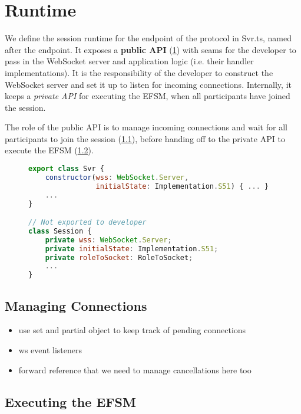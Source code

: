 \section{Runtime}
\label{section:noderuntime}

We define the session runtime for the  endpoint
of the  protocol in Svr.ts,
named after the endpoint.
It exposes a \textbf{public API}
(\cref{lst:noderuntimepublicapi})
with seams for the developer to pass in the WebSocket server 
and application logic
(i.e. their handler implementations).
It is the responsibility of the developer to construct the
WebSocket server and set it up to listen for incoming connections.
Internally, it keeps a \textit{private API}
for executing the EFSM, when all participants have 
joined the session.

The role of the public API is to manage incoming connections and
wait for all participants to join the session 
(\cref{subsection:noderuntimepublic}), before
handing off to the private API to execute the EFSM
(\cref{subsection:noderuntimeprivate}).

\begin{figure}[!h]
\begin{lstlisting}[language=javascript,title=Svr.ts]
export class Svr {
	constructor(wss: WebSocket.Server,
				initialState: Implementation.S51) { ... }
	...
}

// Not exported to developer
class Session {
	private wss: WebSocket.Server;
	private initialState: Implementation.S51;
	private roleToSocket: RoleToSocket;
	...
}
\end{lstlisting}
\label{lst:noderuntimepublicapi}
\end{figure}

\subsection{Managing Connections}
\label{subsection:noderuntimepublic}

\begin{itemize}
\item use set and partial object to keep track of pending connections
\item ws event listeners
\item forward reference that we need to manage cancellations here too
\end{itemize}

\subsection{Executing the EFSM}
\label{subsection:noderuntimeprivate}

